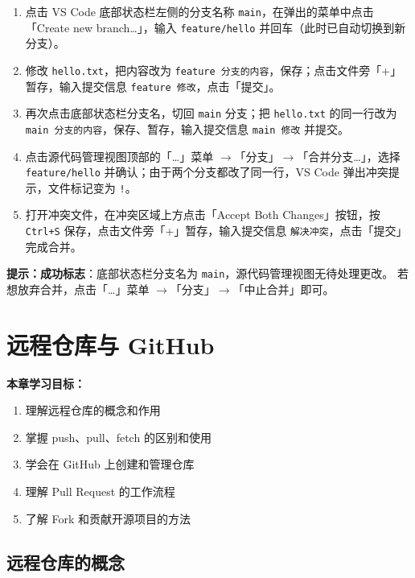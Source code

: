 \documentclass[12pt,a4paper,openany]{ctexbook}
\begin{document}
\medskip
\begin{enumerate}[leftmargin=1.5em]
  \item 点击 VS Code 底部状态栏左侧的分支名称 \texttt{main}，在弹出的菜单中点击「Create new branch…」，输入 \texttt{feature/hello} 并回车（此时已自动切换到新分支）。
  \item 修改 \texttt{hello.txt}，把内容改为 \texttt{feature 分支的内容}，保存；点击文件旁「+」暂存，输入提交信息 \texttt{feature 修改}，点击「提交」。
  \item 再次点击底部状态栏分支名，切回 \texttt{main} 分支；把 \texttt{hello.txt} 的同一行改为 \texttt{main 分支的内容}，保存、暂存，输入提交信息 \texttt{main 修改} 并提交。
  \item 点击源代码管理视图顶部的「…」菜单 $\to$「分支」$\to$「合并分支…」，选择 \texttt{feature/hello} 并确认；由于两个分支都改了同一行，VS Code 弹出冲突提示，文件标记变为 \texttt{!}。
  \item 打开冲突文件，在冲突区域上方点击「Accept Both Changes」按钮，按 \texttt{Ctrl+S} 保存，点击文件旁「+」暂存，输入提交信息 \texttt{解决冲突}，点击「提交」完成合并。
\end{enumerate}
\medskip

\noindent\textbf{提示：}\textbf{成功标志}：底部状态栏分支名为 \texttt{main}，源代码管理视图无待处理更改。
若想放弃合并，点击「…」菜单 $\to$「分支」$\to$「中止合并」即可。

\chapter{远程仓库与 GitHub}

\medskip
\noindent\textbf{本章学习目标：}
\begin{enumerate}[leftmargin=1.5em]
  \item 理解远程仓库的概念和作用
  \item 掌握 push、pull、fetch 的区别和使用
  \item 学会在 GitHub 上创建和管理仓库
  \item 理解 Pull Request 的工作流程
  \item 了解 Fork 和贡献开源项目的方法
\end{enumerate}
\medskip

\section{远程仓库的概念}
\end{document}
